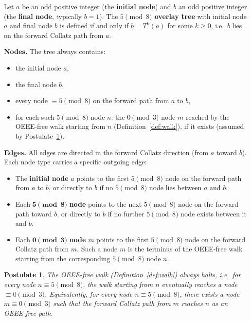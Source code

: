 \documentclass[11pt]{article}
\newtheorem{postulate}{Postulate}
\begin{document}
Let $a$ be an odd positive integer (the \textbf{initial node}) and $b$ an
odd positive integer (the \textbf{final node}, typically $b=1$).  The
\textbf{$5\pmod{8}$ overlay tree} with initial node $a$ and final node $b$ is
defined if and only if $b = T^k(a)$ for some $k \geq 0$, i.e.\ $b$ lies
on the forward Collatz path from $a$.

\medskip
\noindent\textbf{Nodes.} The tree always contains:
\begin{itemize}
  \item the initial node $a$,
  \item the final node $b$,
  \item every node $\equiv 5\pmod{8}$ on the forward path from $a$ to $b$,
  \item for each such $5\pmod{8}$ node $n$: the $0\pmod{3}$ node $m$
        reached by the OEEE-free walk starting from $n$ (Definition~\ref{def:walk}),
        if it exists (assumed by Postulate~\ref{post:halt}).
\end{itemize}

\noindent\textbf{Edges.} All edges are directed in the forward Collatz direction
(from $a$ toward $b$).  Each node type carries a specific outgoing edge:
\begin{itemize}
  \item The \textbf{initial node} $a$ points to the first $5\pmod{8}$ node
        on the forward path from $a$ to $b$, or directly to $b$ if no
        $5\pmod{8}$ node lies between $a$ and $b$.
  \item Each $\mathbf{5\pmod{8}}$ \textbf{node} points to the next
        $5\pmod{8}$ node on the forward path toward $b$, or directly to
        $b$ if no further $5\pmod{8}$ node exists between it and $b$.
  \item Each $\mathbf{0\pmod{3}}$ \textbf{node} $m$ points to the first
        $5\pmod{8}$ node on the forward Collatz path from $m$.  Such a node
        $m$ is the terminus of the OEEE-free walk starting from the
        corresponding $5\pmod{8}$ node $n$.
\end{itemize}

\newtheorem{theorem}{Theorem}

\begin{postulate}
\label{post:halt}
The OEEE-free walk (Definition~\ref{def:walk}) always halts, i.e.\ for every
node $n \equiv 5\pmod{8}$, the walk starting from $n$ eventually reaches a
node $\equiv 0\pmod{3}$.  Equivalently, for every node $n \equiv 5\pmod{8}$,
there exists a node $m \equiv 0\pmod{3}$ such that the forward Collatz path
from $m$ reaches $n$ as an OEEE-free path.
\end{postulate}
\end{document}
